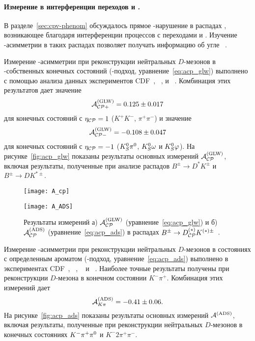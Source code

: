 \paragraph{\boldmath Измерение \gphi в интерференции переходов \btocus и \btoucs.} В разделе~\ref{sec:cpv-phenom} обсуждалось прямое \cpconj-нарушение в распадах \bdk, возникающее благодаря интерференции процессов с переходами \btocus и \btoucs.  Изучение \cpconj-асимметрии в таких распадах позволяет получать информацию об угле \gphi~\ut.

Измерение \cpconj-асимметрии при реконструкции нейтральных $D$-мезонов в \cpconj-собственных конечных состояний (\glw-подход, уравнение~\eqref{eq:acp_glw}) выполнено с помощью анализа данных экспериментов CDF~\cite{cdf_glw}, \babar~\cite{babar_glw}, \belle и \lhcb~\cite{lhcb_glw_ads}.  Комбинация этих результатов дает значение
\begin{equation}
 \mathcal{A}_{\mathcal{CP}+}^{(\textrm{GLW})} =  0.125 \pm 0.017
\end{equation}
для конечных состояний с $\eta_\mathcal{CP}=1$ ($K^+K^-$, $\pi^+\pi^-$) и значение
\begin{equation}
 \mathcal{A}_{\mathcal{CP}-}^{(\textrm{GLW})} = -0.108 \pm 0.047
\end{equation}
для конечных состояний с $\eta_\mathcal{CP}=-1$ ($K_S^0\pi^0$, $K_S^0\omega$ и $K_S^0\varphi$).  На рисунке~\ref{fig:acp_glw} показаны результаты основных измерений $\mathcal{A}_{\mathcal{CP}}^{(\textrm{GLW})}$, включая результаты, полученные при анализе распадов $B^{\pm}\to D^{*}K^{\pm}$ и $B^{\pm}\to DK^{*\pm}$.

\begin{figure}[htb]
\begin{minipage}[b]{0.5\textwidth}
 \centering
  \texttt{[image: A\_cp]}
 \subcaption{}
 \label{fig:acp_glw}
\end{minipage}
\begin{minipage}[b]{0.5\textwidth}
 \centering
  \texttt{[image: A\_ADS]}
 \subcaption{}
 \label{fig:acp_ads}
\end{minipage}
 \caption{Результаты измерений а) $\mathcal{A}_{\mathcal{CP}}^{(\textrm{GLW})}$ (уравнение~\eqref{eq:acp_glw}) и б) $\mathcal{A}_{\mathcal{CP}}^{(\textrm{ADS})}$ (уравнение~\eqref{eq:acp_ads}) в распадах $B^{\pm} \to D^{(*)}_{\mathcal{CP}} K^{(*)\pm}$~\cite{hfag}.}
 \label{fig:acp_bdk}
\end{figure}

Измерение \cpconj-асимметрии при реконструкции нейтральных $D$-мезонов в состояниях с определенным ароматом (\ads-подход, уравнение~\eqref{eq:acp_ads}) выполнено в экспериментах CDF~\cite{cdf_ads}, \babar~\cite{babar_ads}, \belle~\cite{belle_ads} и \lhcb~\cite{lhcb_glw_ads}.  Наиболее точные результаты получены при реконструкции $D$-мезона в конечном состоянии $K^-\pi^+$.  Комбинация этих измерений дает
\begin{equation}
 \mathcal{A}^{(\textrm{ADS})}_{K\pi} = -0.41 \pm 0.06.
\end{equation}
На рисунке~\ref{fig:acp_ads} показаны результаты основных измерений $\mathcal{A}^{(\textrm{ADS})}$, включая результаты, полученные при реконструкции нейтральных $D$-мезонов в конечных состояниях $K^-\pi^+\pi^0$ и $K^-2\pi^+\pi^-$.

